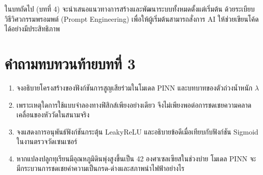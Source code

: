 ในบทถัดไป (บทที่ 4) จะนำเสนอแนวทางการสร้างและพัฒนาระบบทั้งหมดตั้งแต่เริ่มต้น ด้วยระเบียบวิธีวิศวกรรมพรอมพต์ (Prompt Engineering) เพื่อให้ผู้เริ่มต้นสามารถสั่งการ AI ให้ช่วยเขียนโค้ดได้อย่างมีประสิทธิภาพ

\section*{คำถามทบทวนท้ายบทที่ 3}

\begin{enumerate}
    \item จงอธิบายโครงสร้างของฟังก์ชันการสูญเสียร่วมในโมเดล PINN และบทบาทของตัวถ่วงน้ำหนัก $\lambda$
    \item เพราะเหตุใดการใช้แบบจำลองทางฟิสิกส์เพียงอย่างเดียว จึงไม่เพียงพอต่อการชดเชยความคลาดเคลื่อนของหัววัดในสนามจริง
    \item จงแสดงการอนุพันธ์ฟังก์ชันกระตุ้น LeakyReLU และอธิบายข้อดีเมื่อเทียบกับฟังก์ชัน Sigmoid ในงานตรวจวัดเซนเซอร์
    \item หากแปลงปลูกทุเรียนมีอุณหภูมิดินพุ่งสูงขึ้นเป็น 42 องศาเซลเซียสในช่วงบ่าย โมเดล PINN จะมีกระบวนการชดเชยค่าความเป็นกรด-ด่างและสภาพนำไฟฟ้าอย่างไร
\end{enumerate}
